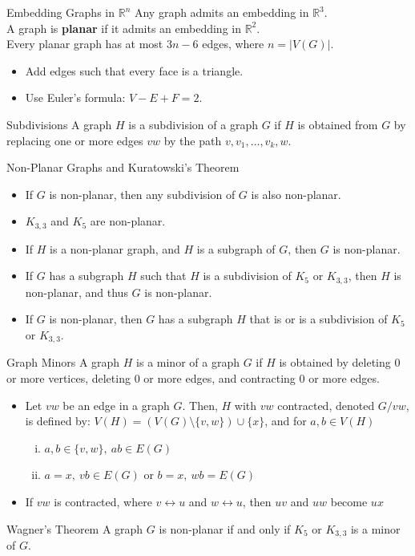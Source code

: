 \documentclass[10pt]{extarticle}
\begin{document}
  \begin{problem}{Embedding Graphs in $\mathbb{R}^n$}
    Any graph admits an embedding in $ \mathbb{R}^3$.\\

    A graph is \textbf{planar} if it admits an embedding in $\mathbb{R}^2$.\\

    Every planar graph has at most $3n-6$ edges, where $n = |V(G)|$.
    \begin{itemize}
      \item Add edges such that every face is a triangle.
      \item Use Euler's formula: $V - E + F = 2$.
    \end{itemize}
  \end{problem}
  \begin{problem}{Subdivisions}
    A graph $H$ is a subdivision of a graph $G$ if $H$ is obtained from $G$ by replacing one or more edges $vw$ by the path $v,v_1,\dots,v_k,w$.
  \end{problem}
  \begin{problem}{Non-Planar Graphs and Kuratowski's Theorem}
    \begin{itemize}
      \item If $G$ is non-planar, then any subdivision of $G$ is also non-planar.
      \item $K_{3,3}$ and $K_5$ are non-planar.
      \item If $H$ is a non-planar graph, and $H$ is a subgraph of $G$, then $G$ is non-planar.
      \item If $G$ has a subgraph $H$ such that $H$ is a subdivision of $K_{5}$ or $K_{3,3}$, then $H$ is non-planar, and thus $G$ is non-planar.
      \item If $G$ is non-planar, then $G$ has a subgraph $H$ that is or is a subdivision of $K_{5}$ or $K_{3,3}$.
    \end{itemize}
  \end{problem}
  \begin{problem}{Graph Minors}
    A graph $H$ is a minor of a graph $G$ if $H$ is obtained by deleting $0$ or more vertices, deleting $0$ or more edges, and contracting $0$ or more edges.
    \begin{itemize}
      \item Let $vw$ be an edge in a graph $G$. Then, $H$ with $vw$ contracted, denoted $G/vw$, is defined by: $V(H) = \left(V(G) \setminus \{v,w\}\right)\cup \{x\}$, and for $a,b\in V(H)$
        \begin{enumerate}[(i)]
          \item $a,b\in \{v,w\},~ab\in E(G)$
          \item $a=x,~vb\in E(G)$ or $b=x,~wb = E(G)$
        \end{enumerate}
      \item If $vw$ is contracted, where $v\leftrightarrow u$ and $w \leftrightarrow u$, then $uv$ and $uw$ become $ux$
    \end{itemize}
  \end{problem}
  \begin{problem}{Wagner's Theorem}
    A graph $G$ is non-planar if and only if $K_5$ or $K_{3,3}$ is a minor of $G$.
  \end{problem}
\end{document}
